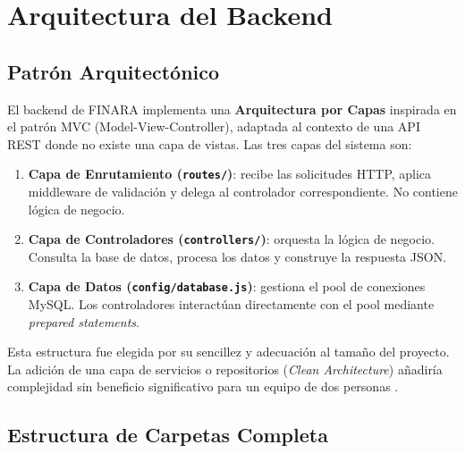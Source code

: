 \chapter{Arquitectura del Backend}

\section{Patrón Arquitectónico}

El backend de FINARA implementa una \textbf{Arquitectura por Capas} inspirada en el patrón MVC (Model-View-Controller), adaptada al contexto de una API REST donde no existe una capa de vistas. Las tres capas del sistema son:

\begin{enumerate}[leftmargin=1.5cm]
  \item \textbf{Capa de Enrutamiento (\texttt{routes/})}: recibe las solicitudes HTTP, aplica middleware de validación y delega al controlador correspondiente. No contiene lógica de negocio.
  \item \textbf{Capa de Controladores (\texttt{controllers/})}: orquesta la lógica de negocio. Consulta la base de datos, procesa los datos y construye la respuesta JSON.
  \item \textbf{Capa de Datos (\texttt{config/database.js})}: gestiona el pool de conexiones MySQL. Los controladores interactúan directamente con el pool mediante \textit{prepared statements}.
\end{enumerate}

Esta estructura fue elegida por su sencillez y adecuación al tamaño del proyecto. La adición de una capa de servicios o repositorios (\textit{Clean Architecture}) añadiría complejidad sin beneficio significativo para un equipo de dos personas \cite{martin_clean_arch}.

\section{Estructura de Carpetas Completa}

